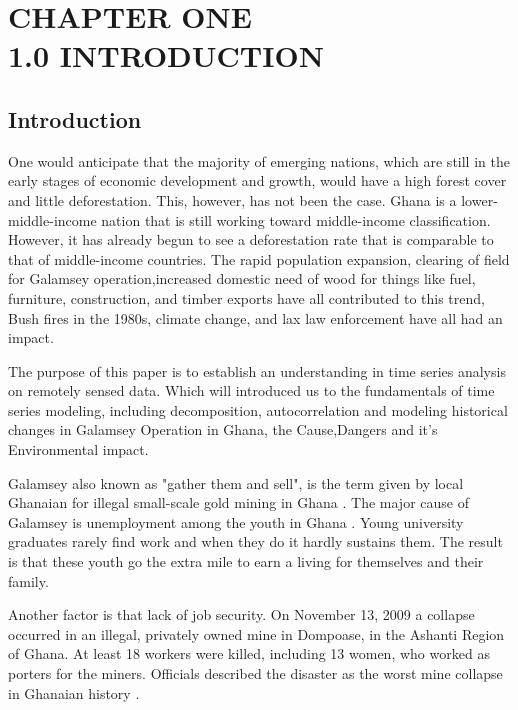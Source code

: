
\chapter{CHAPTER ONE\\1.0 INTRODUCTION} %
\section{Introduction}
\label{Chapter1} %


One would anticipate that the majority of emerging nations, which are still in the early stages of economic development and growth, would have a high forest cover and little deforestation. This, however, has not been the case. Ghana is a lower-middle-income nation that is still working toward middle-income classification. However, it has already begun to see a deforestation rate that is comparable to that of middle-income countries. The rapid population expansion, clearing of field for Galamsey operation,increased domestic need of wood for things like fuel, furniture, construction, and timber exports have all contributed to this trend, Bush fires in the 1980s, climate change, and lax law enforcement have all had an impact.

The purpose of this paper is to establish an understanding in time series analysis on remotely sensed data. Which will introduced us to the fundamentals of time series modeling, including decomposition, autocorrelation and modeling historical changes in Galamsey Operation in Ghana, the Cause,Dangers and it's Environmental impact.

Galamsey also known as "gather them and sell",\parencite{Mantey2017} is the term given by local Ghanaian for illegal small-scale gold mining in Ghana . The major cause of Galamsey is unemployment among the youth in Ghana \parencite{Gracia2018}. Young university graduates rarely find work and when they do it hardly sustains them. The result is that these youth go the extra mile to earn a living for themselves and their family.

Another factor is that lack of job security. On November 13, 2009 a collapse occurred in an illegal, privately owned mine in Dompoase, in the Ashanti Region of Ghana. At least 18 workers were killed, including 13 women, who worked as porters for the miners. Officials described the disaster as the worst mine collapse in Ghanaian history \parencite{BBCNews2009}.

